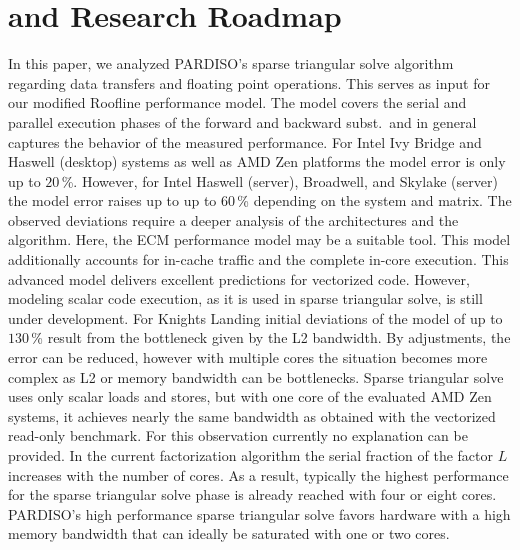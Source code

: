 \chapter{ and Research Roadmap}
\label{sec:conclusion}

In this paper, we analyzed PARDISO's sparse triangular solve algorithm regarding data
transfers and floating point operations.
This serves as input for our modified Roofline performance model.
The model covers the serial and parallel execution phases of the forward and
backward subst.\ and in general captures the behavior of the measured
performance.
%
For Intel Ivy Bridge and Haswell (desktop) systems as well as AMD Zen platforms
the model error is only up to $20$\,\%.
However, for Intel Haswell (server), Broadwell, and Skylake (server) the model
error raises up to up to $60$\,\% depending on the system and matrix.
%
The observed deviations require a deeper analysis
of the architectures
and the algorithm. 
Here, the ECM performance
model may be a suitable tool. 
This model additionally accounts for in-cache traffic and the complete in-core
execution.
This advanced model delivers excellent predictions for vectorized code. 
However, modeling scalar code execution, as it is used in sparse triangular solve, 
is still under development.
%
For Knights Landing initial deviations of the model 
of
up to $130$\,\% 
result from the bottleneck given by the L2 bandwidth.
By
adjustments, the error can be reduced, however with multiple cores
the situation becomes more complex as L2 or memory bandwidth can be bottlenecks.
%
%
Sparse triangular solve uses only scalar loads and stores, but with one core
of the evaluated AMD Zen systems, it achieves nearly the same bandwidth as
obtained with the vectorized read-only benchmark. For this %
observation currently
no explanation can be provided.
%
In the current factorization algorithm the serial fraction of the factor $L$
increases with the number of cores.
As a result, typically the highest performance for the sparse
triangular solve phase is already reached with four or eight cores.
%
PARDISO's high performance sparse triangular solve favors hardware with a high
memory bandwidth that can ideally be saturated with one or two cores. %


